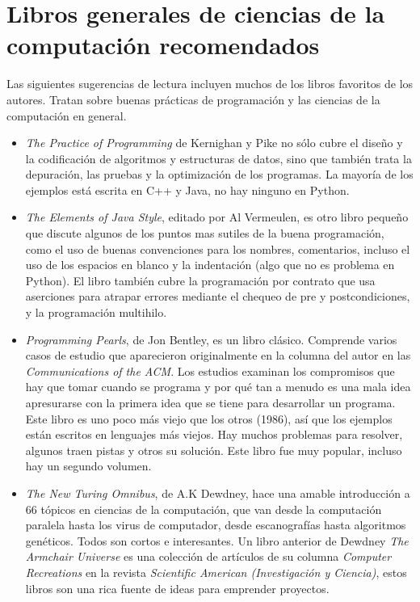 \section{Libros generales de ciencias de la computación recomendados}

Las siguientes sugerencias de lectura incluyen muchos de los libros
favoritos de los autores. Tratan sobre buenas prácticas de programación
y las ciencias de la computación en general.

\begin{itemize}

\item {\em The Practice of Programming} de Kernighan y Pike no sólo
cubre el diseño y la codificación de algoritmos y estructuras de datos,
sino que también trata la depuración, las pruebas y la optimización
de los programas. La mayoría de los ejemplos está escrita en  C++ y
 Java, no hay ninguno en Python.

\item {\em The Elements of Java Style}, editado por Al Vermeulen, es 
otro libro pequeño que discute algunos de los puntos mas sutiles
de la buena programación, como el uso de buenas convenciones para
los nombres, comentarios, incluso el uso de los espacios en blanco
y la indentación (algo que no es problema en Python). El libro
también cubre la programación por contrato que usa aserciones para
atrapar errores mediante el chequeo de pre y postcondiciones, y la
programación multihilo.

\item {\em Programming Pearls}, de Jon Bentley,  es un libro clásico.
Comprende varios casos de estudio que aparecieron originalmente
en la columna del autor en las  {\em Communications of the ACM}.  Los
estudios examinan los compromisos que hay que tomar cuando se programa
y por qué tan a menudo es una mala idea apresurarse con la primera
idea que se tiene para desarrollar un programa. Este libro es uno poco más 
viejo que los otros (1986), así que los ejemplos están escritos en lenguajes
más viejos. Hay muchos problemas para resolver, algunos traen pistas 
y otros su solución. Este libro fue muy popular, incluso hay un 
segundo volumen.

\item {\em The New Turing Omnibus}, de A.K Dewdney, hace una amable
introducción a 66 tópicos en ciencias de la computación, que
van desde la computación paralela hasta los virus de computador,
desde escanografías hasta algoritmos genéticos. Todos son cortos
e interesantes. Un libro anterior de  Dewdney {\em The Armchair Universe}
es una colección de artículos de su columna {\em Computer Recreations} en 
la revista {\em Scientific American (Investigación y Ciencia)},
estos libros son una rica fuente de ideas para emprender proyectos.


\end{itemize}
